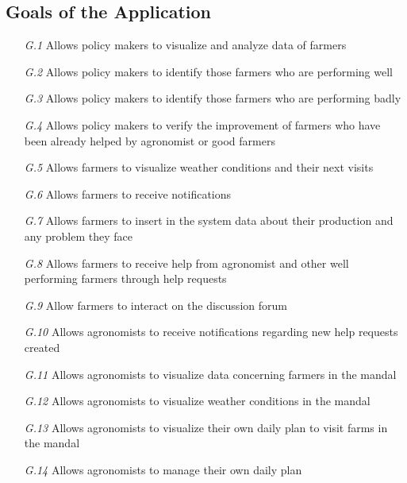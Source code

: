 \subsection{Goals of the Application}
\begin{itemize}
    \item [\textit {G.1}] Allows policy makers to visualize and analyze data of farmers
    \item [\textit {G.2}] Allows policy makers to identify those farmers who are performing well
    \item [\textit {G.3}] Allows policy makers to identify those farmers who are performing badly
    \item [\textit {G.4}] Allows policy makers to verify the improvement of farmers who have been already helped by agronomist or good farmers
    \item [\textit {G.5}] Allows farmers to visualize weather conditions and their next visits
    \item [\textit {G.6}] Allows farmers to receive notifications
    \item [\textit {G.7}] Allows farmers to insert in the system data about their production and any problem they face
    \item [\textit {G.8}] Allows farmers to receive help from agronomist and other well performing farmers through help requests
    \item [\textit {G.9}] Allow farmers to interact on the discussion forum
    \item [\textit {G.10}] Allows agronomists to receive notifications regarding new help requests created
    \item [\textit {G.11}] Allows agronomists to visualize data concerning farmers in the mandal
    \item [\textit {G.12}] Allows agronomists to visualize weather conditions in the mandal
    \item [\textit {G.13}] Allows agronomists to visualize their own daily plan to visit farms in the mandal
    \item [\textit {G.14}] Allows agronomists to manage their own daily plan

\end{itemize}